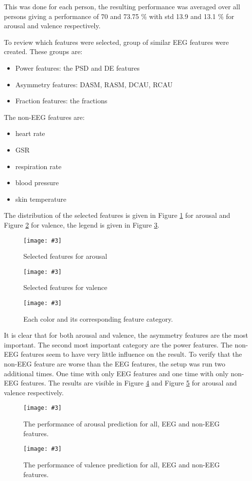 \documentclass[12pt,journal,compsoc]{IEEEtran}
\newcommand{\npar}{\par \vspace{2.3ex plus 0.3ex minus 0.3ex}}
\newcommand{\mijnfiguur}[4][H]{            %
    \begin{figure}[#1]                      %
        \begin{center}                      %
            \texttt{[image: \#3]}        %
            \caption{#4\label{#3}}          %
        \end{center}
    \end{figure}
    }
\begin{document}
\npar

This was done for each person, the resulting performance was averaged over all persons giving a performance of  70 and 73.75 \% with std 13.9 and 13.1 \% for arousal and valence respectively. 

\npar

To review which features were selected, group of similar EEG features were created. These groups are:
\begin{itemize}
\item Power features: the PSD and DE features
\item Asymmetry features: DASM, RASM, DCAU, RCAU
\item Fraction features: the fractions
\end{itemize}
The non-EEG features are:
\begin{itemize}
\item heart rate
\item GSR
\item respiration rate
\item blood pressure
\item skin temperature
\end{itemize}

The distribution of the selected features is given in Figure \ref{arousalALLRF} for arousal and Figure \ref{valenceALLRF} for valence, the legend is given in Figure \ref{legend}.

\mijnfiguur{width=0.25\textwidth}{arousalALLRF}{Selected features for arousal}
\mijnfiguur{width=0.25\textwidth}{valenceALLRF}{Selected features for valence}
\mijnfiguur{width=0.25\textwidth}{legend}{Each color and its corresponding feature category.}

It is clear that for both arousal and valence, the asymmetry features are the most important. The second most important category are the power features. The non-EEG features seem to have very little influence on the result. To verify that the non-EEG feature are worse than the EEG features, the setup was run two additional times. One time with only EEG features and one time with only non-EEG features. The results are visible in Figure \ref{arousalphyeegall} and Figure \ref{valencephyeegall} for arousal and valence respectively. 

\mijnfiguur{width=.5\textwidth}{arousalphyeegall}{The performance of arousal prediction for all, EEG and non-EEG features.}

\mijnfiguur{width=.5\textwidth}{valencephyeegall}{The performance of valence prediction for all, EEG and non-EEG features.}
\end{document}
